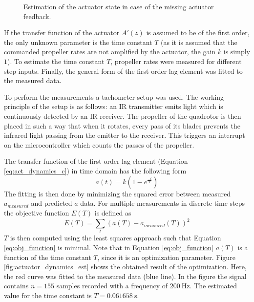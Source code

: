 \documentclass[11pt, a4paper, twoside]{report}
\begin{document}
\begin{figure}[H]
	\centering 
	\captionsetup{justification=centering, singlelinecheck=off, font=bf, belowskip=-0.5cm}
	\caption[Estimation of the actuator state in case of the missing actuator feedback]{Estimation of the actuator state in case of the missing actuator feedback.}
	\label{fig:actuator}
\end{figure}

If the transfer function of the actuator $A'(z)$ is assumed to be of the first order, the only unknown parameter is the time constant $T$ (as it is assumed that the commanded propeller rates are not amplified by the actuator, the gain $k$ is simply $1$). To estimate the time constant $T$, propeller rates were measured for different step inputs. Finally, the general form of the first order lag element was fitted to the measured data. 

To perform the measurements a tachometer setup was used. The working principle of the setup is as follows: an \acrfull{IR} transmitter emits light which is continuously detected by an \acrshort{IR} receiver. The propeller of the quadrotor is then placed in such a way that when it rotates, every pass of its blades prevents the infrared light passing from the emitter to the receiver. This triggers an interrupt on the microcontroller which counts the passes of the propeller.

The transfer function of the first order lag element (Equation \ref{eq:act_dynamics_c}) in time domain has the following form 
\begin{equation}
	a(t) = 	k (1 - e^{\frac{-t}{T}})
	\label{eq:act_dynamics_time}
\end{equation}
The fitting is then done by minimizing the squared error between measured $a_{measured}$ and predicted $a$ data. For multiple measurements in discrete time steps the objective function $E(T)$ is defined as 
\begin{equation}
	E(T) = \sum_{t}^{} (a(T) - a_{measured}(T))^2
	\label{eq:obj_function}
\end{equation}
$T$ is then computed using the least squares approach such that Equation \ref{eq:obj_function} is minimal. Note that in Equation \ref{eq:obj_function} $a(T)$ is a function of the time constant $T$, since it is an optimization parameter. Figure \ref{fig:actuator_dynamics_est} shows the obtained result of the optimization. Here, the red curve was fitted to the measured data (blue line). In the figure the signal contains $n=155$ samples recorded with a frequency of $200~\si{\Hz}$. The estimated value for the time constant is $T = 0.061658~\si{\s}$.
	
\end{document}
